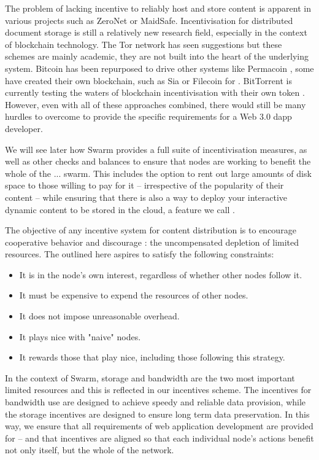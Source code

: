 The problem of lacking incentive to reliably host and store content is apparent in various projects such as ZeroNet or MaidSafe. Incentivisation for distributed document storage is still a relatively new research field, especially in the context of blockchain technology. The Tor network has seen suggestions \cite{jansen2014onions,ghoshetal2014tor} but these schemes are mainly academic, they are not built into the heart of the underlying system. Bitcoin has been repurposed to drive other systems like Permacoin \cite{miller2014permacoin}, some have created their own blockchain, such as Sia \cite{vorick2014sia} or Filecoin \cite{filecoin2014} for . BitTorrent is currently testing the waters of blockchain incentivisation with their own token \cite{tron2018,bittorrent2019}. However, even with all of these approaches combined, there would still be many hurdles to overcome to provide the specific requirements for a Web 3.0 dapp developer.

We will see later how Swarm provides a full suite of incentivisation measures, as well as other checks and balances to ensure that nodes are working to benefit the whole of the ... swarm. This includes the option to rent out large amounts of disk space to those willing to pay for it – irrespective of the popularity of their content – while ensuring that there is also a way to deploy your interactive dynamic content to be stored in the cloud, a feature we call .

The objective of any incentive system for  content distribution is to encourage cooperative behavior and discourage : the uncompensated depletion of limited resources. The  outlined here aspires to satisfy the following constraints:

\begin{itemize}
    \item It is in the node's own interest, regardless of whether other nodes follow it.
    \item It must be expensive to expend the resources of other nodes.
    \item It does not impose unreasonable overhead.
    \item It plays nice with "naive" nodes.
    \item It rewards those that play nice, including those following this strategy.
\end{itemize}

In the context of Swarm, storage and bandwidth are the two most important limited resources and this is reflected in our incentives scheme. The incentives for bandwidth use are designed to achieve speedy and reliable data provision, while the storage incentives are designed to ensure long term data preservation. In this way, we ensure that all requirements of web application development are provided for – and that incentives are aligned so that each individual node's actions benefit not only itself, but the whole of the network. 


